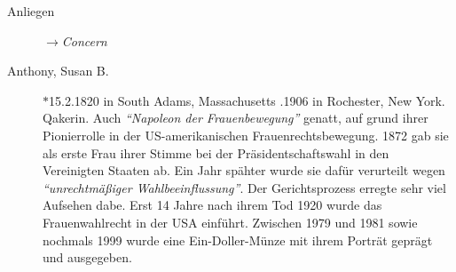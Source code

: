 \begin{description}
 \item[Anliegen] $\to$\textit{Concern}

 \item[Anthony, Susan B.] $\ast$15.2.1820 in South Adams, Massachusetts
.1906 in Rochester, New York. Qakerin. Auch \textit{"`Napoleon der
Frauenbewegung"'} genatt, auf grund ihrer Pionierrolle in der US-amerikanischen
Frauenrechtsbewegung. 1872 gab sie als erste Frau ihrer Stimme bei der
Präsidentschaftswahl in den Vereinigten Staaten ab. Ein Jahr spähter wurde sie
dafür verurteilt wegen \textit{"`unrechtmäßiger Wahlbeeinflussung"'}. Der
Gerichtsprozess erregte sehr viel Aufsehen dabe. Erst 14 Jahre nach ihrem Tod
1920 wurde das Frauenwahlrecht in der USA einführt. Zwischen 1979 und 1981 sowie
nochmals 1999 wurde eine Ein-Doller-Münze mit ihrem Porträt geprägt und
ausgegeben.

 \end{description}
\normalsize
